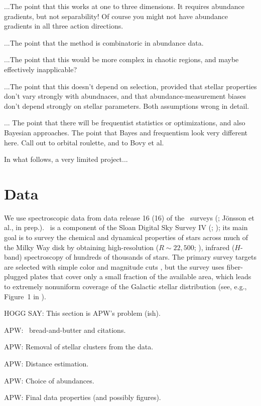 \documentclass[modern]{aastex63}
\newcommand{\dr}[1]{\acronym{DR}#1}
\newcommand{\apogee}{\acronym{APOGEE}}
\newcommand{\sdssiv}{\acronym{SDSS-IV}}
\begin{document}
...The point that this works at one to three dimensions. It requires
abundance gradients, but not separability!  Of course you might not
have abundance gradients in all three action directions.

...The point that the method is combinatoric in abundance data.

...The point that this would be more complex in chaotic regions, and
maybe effectively inapplicable?

...The point that this doesn't depend on selection, provided that
stellar properties don't vary strongly with abundnaces, and that
abundance-measurement biases don't depend strongly on stellar
parameters. Both assumptions wrong in detail.

... The point that there will be frequentist statistics or
optimizations, and also Bayesian approaches.  The point that Bayes and
frequentism look very different here. Call out to orbital roulette,
and to Bovy et al.

In what follows, a very limited project...

\section{Data}

We use spectroscopic data from data release 16 (\dr{16}) of the \apogee\ surveys
(\citealt{Majewski:2017, DR16}; J\"onsson et al., in prep.).
\apogee\ is a component of the Sloan Digital Sky Survey IV (\sdssiv;
\citealt{Gunn:2006, Blanton:2017}); its main goal is to survey the chemical
and dynamical properties of stars across much of the Milky Way disk by obtaining
high-resolution ($R \sim 22,500$; \citealt{Wilson:2019}), infrared ($H$-band)
spectroscopy of hundreds of thousands of stars.
The primary survey targets are selected with simple color and magnitude cuts
\citep{Zasowski:2013, Zasowski:2017}, but the survey uses fiber-plugged plates
that cover only a small fraction of the available area, which leads to extremely
nonuniform coverage of the Galactic stellar distribution (see, e.g., Figure~1 in
\citealt{DR16}).


HOGG SAY: This section is APW's problem (ish).

APW: \apogee\ bread-and-butter and citations.

APW: Removal of stellar clusters from the data.

APW: Distance estimation.

APW: Choice of abundances.

APW: Final data properties (and possibly figures).
\end{document}
